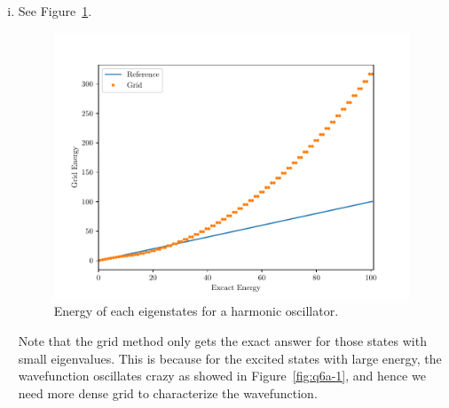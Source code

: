 \documentclass{article}
\begin{document}
\begin{enumerate}[1.]
\begin{enumerate}[(A)]
\begin{enumerate}[(i)]
      \item See Figure~\ref{fig:q6a-2}.
      \begin{figure}[H]
        \centering
        \includegraphics[width=0.6\linewidth]{q6a-2.pdf}
        \caption{Energy of each eigenstates for a harmonic oscillator.}
        \label{fig:q6a-2}
      \end{figure}
      Note that the grid method only gets the exact answer for those states with small eigenvalues. This is because for the excited states with large energy, the wavefunction oscillates crazy as showed in Figure~\ref{fig:q6a-1}, and hence we need more dense grid to characterize the wavefunction.  
      

\end{enumerate}
\end{enumerate}
\end{enumerate}
\end{document}
